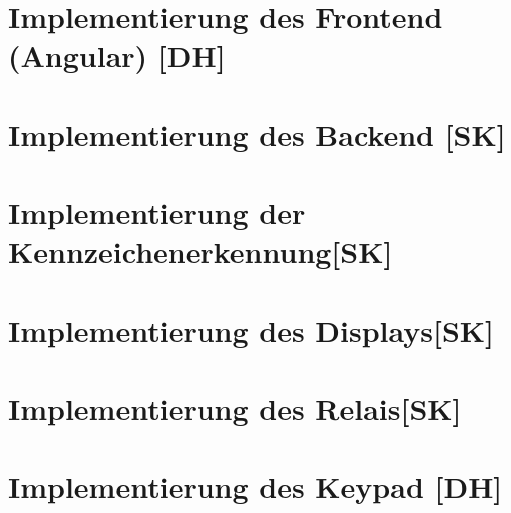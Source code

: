 \section{Implementierung des Frontend (Angular) [DH]}

\section{Implementierung des Backend [SK]}

\section{Implementierung der Kennzeichenerkennung[SK]}

\section{Implementierung des Displays[SK]}

\section{Implementierung des Relais[SK]}

\section{Implementierung des Keypad [DH]}
